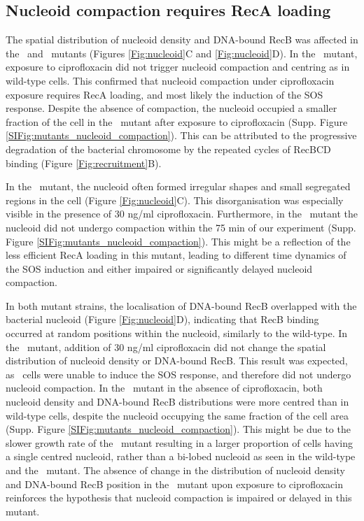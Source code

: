 \subsection*{Nucleoid compaction requires RecA loading}

The spatial distribution of nucleoid density and DNA-bound RecB was affected in the \dreca\ and \geneteneighty\ mutants (Figures \ref{Fig:nucleoid}C and \ref{Fig:nucleoid}D). In the \dreca\ mutant, exposure to ciprofloxacin did not trigger nucleoid compaction and centring as in wild-type cells. This confirmed that nucleoid compaction under ciprofloxacin exposure requires RecA loading, and most likely the induction of the SOS response. Despite the absence of compaction, the nucleoid occupied a smaller fraction of the cell in the \dreca\ mutant after exposure to ciprofloxacin (Supp. Figure \ref{SIFig:mutants_nucleoid_compaction}). This can be attributed to the progressive degradation of the bacterial chromosome by the repeated cycles of RecBCD binding (Figure \ref{Fig:recruitment}B).

In the \geneteneighty\ mutant, the nucleoid often formed irregular shapes and small segregated regions in the cell (Figure \ref{Fig:nucleoid}C). This disorganisation was especially visible in the presence of 30 ng/ml ciprofloxacin. Furthermore, in the \geneteneighty\ mutant the nucleoid did not undergo compaction within the 75 min of our experiment (Supp. Figure \ref{SIFig:mutants_nucleoid_compaction}). This might be a reflection of the less efficient RecA loading in this mutant, leading to different time dynamics of the SOS induction and either impaired or significantly delayed nucleoid compaction.

In both mutant strains, the localisation of DNA-bound RecB overlapped with the bacterial nucleoid (Figure \ref{Fig:nucleoid}D), indicating that RecB binding occurred at random positions within the nucleoid, similarly to the wild-type. In the \dreca\ mutant, addition of 30 ng/ml ciprofloxacin did not change the spatial distribution of nucleoid density or DNA-bound RecB. This result was expected, as \dreca\ cells were unable to induce the SOS response, and therefore did not undergo nucleoid compaction. In the \geneteneighty\ mutant in the absence of ciprofloxacin, both nucleoid density and DNA-bound RecB distributions were more centred than in wild-type cells, despite the nucleoid occupying the same fraction of the cell area (Supp. Figure \ref{SIFig:mutants_nucleoid_compaction}). This might be due to the slower growth rate of the \teneighty\ mutant resulting in a larger proportion of cells having a single centred nucleoid, rather than a bi-lobed nucleoid as seen in the wild-type and the \dreca\ mutant. The absence of change in the distribution of nucleoid density and DNA-bound RecB position in the \geneteneighty\ mutant upon exposure to ciprofloxacin reinforces the hypothesis that nucleoid compaction is impaired or delayed in this mutant.
